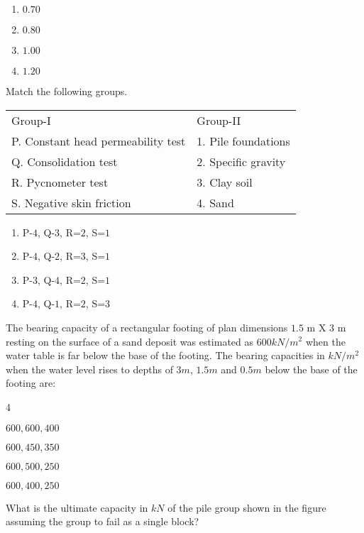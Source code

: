 	\begin{enumerate}
		\item $0.70$
		\item $0.80$
		\item $1.00$
		\item $1.20$		
	\end{enumerate}
\item Match the following groups.\\
\begin{center}
\begin{tabular}{ll}
    {Group-I} & {Group-II} \\
    P. Constant head permeability test & 1. Pile foundations \\
    Q. Consolidation test & 2. Specific gravity \\
    R. Pycnometer test & 3. Clay soil \\
    S. Negative skin friction & 4. Sand \\
\end{tabular}
\end{center}
	\begin{enumerate}
		\item P-$4$, Q-$3$, R=$2$, S=$1$
		\item P-$4$, Q-$2$, R=$3$, S=$1$
		\item P-$3$, Q-$4$, R=$2$, S=$1$
		\item P-$4$, Q-$1$, R=$2$, S=$3$
	\end{enumerate}
\item The bearing capacity of a rectangular footing of plan dimensions $1.5$ m X $3$ m resting on the surface of a sand deposit was estimated as $600kN/m^2$ when the water table is far below the base of the footing. The bearing capacities in $kN/m^2$ when the water level rises to depths of $3m$, $1.5m$ and $0.5m$ below the base of the footing are:
	\begin{enumerate} 
	\end{enumerate}
\item What is the ultimate capacity in $kN$ of the pile group shown in the figure assuming the group to fail as a single block?\\
